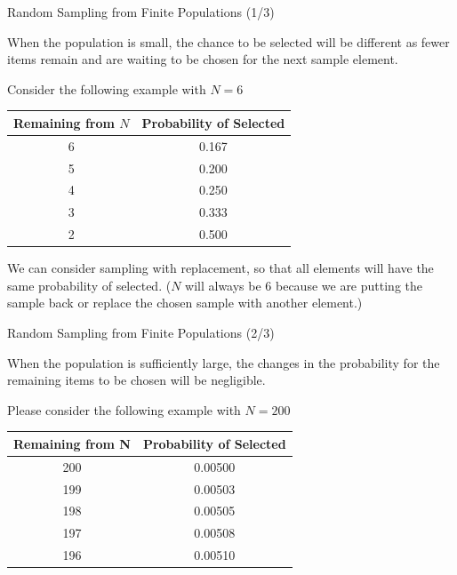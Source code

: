 \documentclass{beamer}
\begin{document}
\begin{frame}{Random Sampling from Finite Populations (1/3)}

When the population is small, the chance to be selected will be different as fewer items remain and are waiting to be chosen for the next sample element.

\vspace{0.3cm}
Consider the following example with $N=6$
\begin{table}[]

\begin{tabular}{c|c}
\hline
Remaining from $N$ & Probability of Selected \\ \hline
6                & 0.167                   \\ \hline
5                & 0.200                   \\ \hline
4                & 0.250                   \\ \hline
3                & 0.333                   \\ \hline
2                & 0.500                   \\ \hline
\end{tabular}
\end{table}

We can consider sampling with replacement, so that all elements will have the same probability of selected. ($N$ will always be 6 because we are putting the sample back or replace the chosen sample with another element.)

\end{frame}

\begin{frame}{Random Sampling from Finite Populations (2/3)}

When the population is sufficiently large, the changes in the probability for the remaining items to be chosen will be negligible. 

Please consider the following example with $N = 200$
\begin{table}[]
\begin{tabular}{c|c}
\hline
Remaining from N & Probability of Selected \\ \hline
200              & 0.00500                 \\ \hline
199              & 0.00503                 \\ \hline
198              & 0.00505                 \\ \hline
197              & 0.00508                 \\ \hline
196              & 0.00510                 \\ \hline
\end{tabular}
\end{table}

\end{frame}
\end{document}
